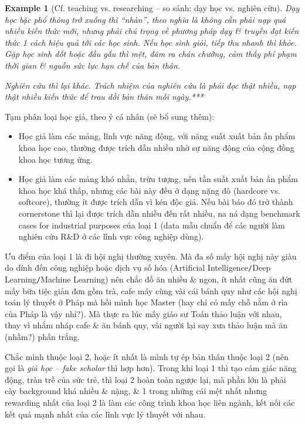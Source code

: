 \documentclass[12pt]{article}
\newtheorem{example}{Example}
\begin{document}
\begin{example}[Cf. teaching vs. researching -- so sánh: dạy học vs. nghiên cứu]
	Dạy học bậc phổ thông trở xuống thì ``nhàn'', theo nghĩa là không cần phải nạp quá nhiều kiến thức mới, nhưng phải chú trọng về phương pháp dạy \& truyền đạt kiến thức 1 cách hiệu quả tới các học sinh. Nếu học sinh giỏi, tiếp thu nhanh thì khỏe. Gặp học sinh dốt hoặc đầu gấu thì mệt, đâm ra chán chường, cảm thấy phí phạm thời gian \& nguồn sức lực hạn chế của bản thân.
	
	Nghiên cứu thì lại khác. Trách nhiệm của nghiên cứu là phải đọc thật nhiều, nạp thật nhiều kiến thức để trau dồi bản thân mỗi ngày.***
\end{example}
Tạm phân loại học giả, theo ý cá nhân (sẽ bổ sung thêm):
\begin{itemize}
	\item Học giả làm các mảng, lĩnh vực năng động, với năng suất xuất bản ấn phẩm khoa học cao, thường được trích dẫn nhiều nhờ sự năng động của cộng đồng khoa học tương ứng.
	\item Học giả làm các mảng khó nhằn, trừu tượng, nên tần suất xuất bản ấn phẩm khoa học khá thấp, nhưng các bài này đều ở dạng nặng đô (hardcore vs. softcore), thường ít được trích dẫn vì kén độc giả. Nếu bài báo đó trở thành cornerstone thì lại được trích dẫn nhiều đến rất nhiều, na ná dạng benchmark cases for industrial purposes của loại 1 (data mẫu chuẩn để các người làm nghiên cứu R\&D ở các lĩnh vực công nghiệp dùng).
\end{itemize}
Ưu điểm của loại 1 là đi hội nghị thường xuyên. Mà đa số mấy hội nghị này giàu do dính đến công nghiệp hoặc dịch vụ số hóa (Artificial Intelligence{\tt/}Deep Learning{\tt/}Machine Learning) nên chắc đồ ăn nhiều \& ngon, ít nhất cũng ăn đứt mấy bữa tiệc giản đơn gồm trà, cafe máy cùng vài cái bánh quy như các hội nghị toán lý thuyết ở Pháp mà hồi mình học Master (hay chỉ có mấy chỗ nằm ở rìa của Pháp là vậy nhỉ?). Mà thực ra lúc mấy giáo sư Toán thảo luận với nhau, thay vì nhắm nháp cafe \& ăn bánh quy, vài người lại say xưa thảo luận mà ăn (nhầm?) phấn trắng.

Chắc mình thuộc loại 2, hoặc ít nhất là mình tự ép bản thân thuộc loại 2 (nên gọi là {\it giả học -- fake scholar} thì hợp hơn). Trong khi loại 1 thì tạo cảm giác năng động, tràn trề của sức trẻ, thì loại 2 hoàn toàn ngược lại, mà phần lớn là phải cày background khá nhiều \& nặng, \& 1 trong những cái mệt nhất nhưng rewarding nhất của loại 2 là làm các công trình khoa học liên ngành, kết nối các kết quả mạnh nhất của các lĩnh vực lý thuyết với nhau.
\end{document}
